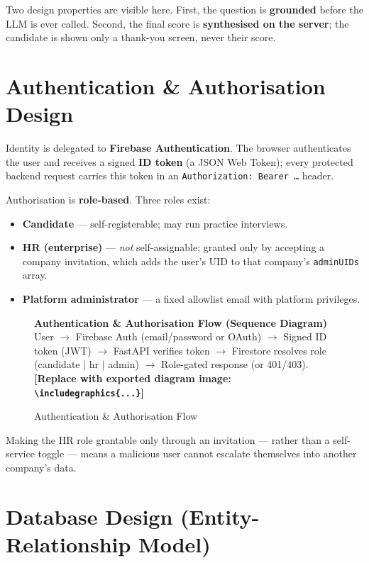 \documentclass[12pt,a4paper,oneside]{report}
\newcommand{\diagramplaceholder}[1]{%
  \begin{tcolorbox}[
    colback=gray!5, colframe=gray!50,
    boxrule=0.4pt, arc=2pt,
    left=10pt, right=10pt, top=8pt, bottom=8pt,
    fontupper=\small\itshape
  ]
  \centering #1\\[4pt]
  \textbf{[Replace with exported diagram image: \texttt{\textbackslash includegraphics\{...\}}]}
  \end{tcolorbox}%
}
\begin{document}
Two design properties are visible here. First, the question is \textbf{grounded} before the
LLM is ever called. Second, the final score is \textbf{synthesised on the server}; the
candidate is shown only a thank-you screen, never their score.

\section{Authentication \& Authorisation Design}

Identity is delegated to \textbf{Firebase Authentication}. The browser authenticates the user
and receives a signed \textbf{ID token} (a JSON Web Token); every protected backend request
carries this token in an \texttt{Authorization: Bearer \ldots} header.

Authorisation is \textbf{role-based}. Three roles exist:

\begin{itemize}
  \item \textbf{Candidate} --- self-registerable; may run practice interviews.
  \item \textbf{HR (enterprise)} --- \textit{not} self-assignable; granted only by accepting a
    company invitation, which adds the user's UID to that company's \texttt{adminUIDs} array.
  \item \textbf{Platform administrator} --- a fixed allowlist email with platform privileges.
\end{itemize}

\begin{figure}[H]
\centering
\diagramplaceholder{%
  \textbf{Authentication \& Authorisation Flow (Sequence Diagram)}\\
  User $\to$ Firebase Auth (email/password or OAuth) $\to$ Signed ID token (JWT) $\to$
  FastAPI verifies token $\to$ Firestore resolves role (candidate $|$ hr $|$ admin) $\to$
  Role-gated response (or 401/403).%
}
\caption{Authentication \& Authorisation Flow}
\label{fig:auth}
\end{figure}

Making the HR role grantable only through an invitation --- rather than a self-service toggle
--- means a malicious user cannot escalate themselves into another company's data.

\section{Database Design (Entity-Relationship Model)}
\end{document}
